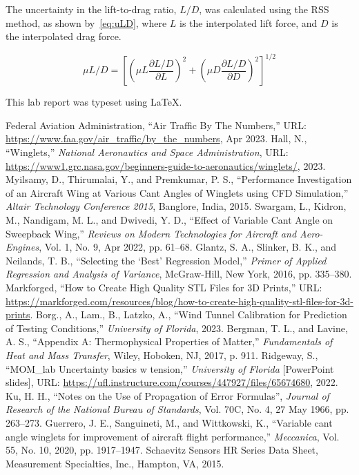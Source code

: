 \documentclass[journal,letterpaper]{IEEEtran}
\begin{document}
\pagebreak
The uncertainty in the lift-to-drag ratio, $L/D$, was calculated using the RSS method, as shown by~\eqref{eq:uLD}, where $L$ is the interpolated lift force, and $D$ is the interpolated drag force.

\begin{equation} \label{eq:uLD}
    \mu L/D = \left[\left(\mu L \frac{\partial L/D}{\partial L}\right)^2 + \left(\mu D \frac{\partial L/D}{\partial D}\right)^2\right]^{1/2}
\end{equation}

This lab report was typeset using \LaTeX.

\begin{thebibliography}{99}
     Federal Aviation Administration, ``Air Traffic By The Numbers,'' URL: \url{https://www.faa.gov/air_traffic/by_the_numbers}, Apr 2023.
     Hall, N., ``Winglets,'' \textit{National Aeronautics and Space Administration}, URL: \url{https://www1.grc.nasa.gov/beginners-guide-to-aeronautics/winglets/}, 2023.
     Myilsamy, D., Thirumalai, Y., and Premkumar, P. S., ``Performance Investigation of an Aircraft Wing at Various Cant Angles of Winglets using CFD Simulation,'' \textit{Altair Technology Conference 2015}, Banglore, India, 2015.
     Swargam, L., Kidron, M., Nandigam, M. L., and Dwivedi, Y. D., ``Effect of Variable Cant Angle on Sweepback Wing,'' \textit{Reviews on Modern Technologies for Aircraft and Aero-Engines}, Vol. 1, No. 9, Apr 2022, pp. 61--68.
     Glantz, S. A., Slinker, B. K., and Neilands, T. B., ``Selecting the `Best' Regression Model,'' \textit{Primer of Applied Regression and Analysis of Variance}, McGraw-Hill, New York, 2016, pp. 335--380.
     Markforged, ``How to Create High Quality STL Files for 3D Prints,'' URL: \url{https://markforged.com/resources/blog/how-to-create-high-quality-stl-files-for-3d-prints}.
     Borg., A., Lam., B., Latzko, A., ``Wind Tunnel Calibration for Prediction of Testing Conditions,'' \textit{University of Florida}, 2023.
     Bergman, T. L., and Lavine, A. S., ``Appendix A: Thermophysical Properties of Matter,'' \textit{Fundamentals of Heat and Mass Transfer}, Wiley, Hoboken, NJ, 2017, p. 911.
     Ridgeway, S., ``MOM\_lab Uncertainty basics w tension,'' \textit{University of Florida} [PowerPoint slides], URL: \url{https://ufl.instructure.com/courses/447927/files/65674680}, 2022.
     Ku, H. H., ``Notes on the Use of Propagation of Error Formulas'', \textit{Journal of Research of the National Bureau of Standards}, Vol. 70C, No. 4, 27 May 1966, pp. 263--273.
     Guerrero, J. E., Sanguineti, M., and Wittkowski, K., ``Variable cant angle winglets for improvement of aircraft flight performance,'' \textit{Meccanica}, Vol. 55, No. 10, 2020, pp. 1917--1947.
     Schaevitz Sensors HR Series Data Sheet, Measurement Specialties, Inc., Hampton, VA, 2015.
\end{thebibliography}
\end{document}
